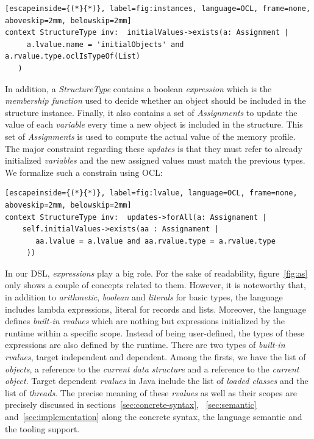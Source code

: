 \begin{lstlisting}[escapeinside={(*}{*)}, label=fig:instances, language=OCL, frame=none, aboveskip=2mm, belowskip=2mm]
context StructureType inv:  initialValues->exists(a: Assignment | 
     a.lvalue.name = 'initialObjects' and a.rvalue.type.oclIsTypeOf(List)
   ) 
\end{lstlisting}

In addition, a \textit{StructureType} contains a boolean \textit{expression} which is the \textit{membership function} used to decide whether an object should be included in the structure instance.
Finally, it also contains a set of \textit{Assignments} to update the value of each \textit{variable} every time a new object is included in the structure.
This set of \textit{Assignments} is used to compute the actual value of the memory profile.
The major constraint regarding these \textit{updates} is that they must refer to already initialized \textit{variables} and the new assigned values must match the previous types.
We formalize such a constrain using OCL:

\begin{lstlisting}[escapeinside={(*}{*)}, label=fig:lvalue, language=OCL, frame=none, aboveskip=2mm, belowskip=2mm]
context StructureType inv:  updates->forAll(a: Assignament | 
    self.initialValues->exists(aa : Assignament | 
       aa.lvalue = a.lvalue and aa.rvalue.type = a.rvalue.type
     ))
\end{lstlisting}

In our DSL, \textit{expressions} play a big role.
For the sake of readability, figure~\ref{fig:as} only shows a couple of concepts related to them.
However, it is noteworthy that, in addition to \textit{arithmetic}, \textit{boolean} and \textit{literals} for basic types, the language includes lambda expressions, literal for records and lists.
Moreover, the language defines \textit{built-in rvalues} which are nothing but expressions initialized by the runtime within a specific scope.
Instead of being user-defined, the types of these expressions are also defined by the runtime.
There are two types of \textit{built-in rvalues}, target independent and dependent.
Among the firsts, we have the list of  \textit{objects}, a reference to the \textit{current data structure} and a reference to the \textit{current object}.
Target dependent \textit{rvalues} in Java include the list of \textit{loaded classes} and the list of \textit{threads}.
The precise meaning of these \textit{rvalues} as well as their scopes are precisely discussed in sections~\ref{sec:concrete-syntax}, ~\ref{sec:semantic} and~\ref{sec:implementation} along the concrete syntax, the language semantic and the tooling support.

